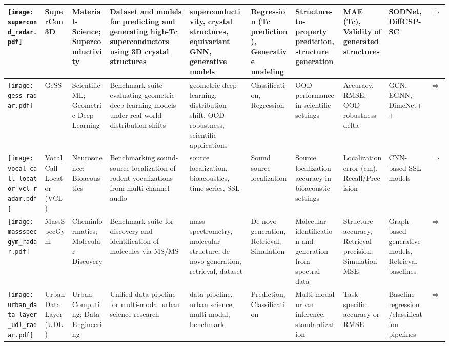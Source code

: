 \begin{landscape}
{\begin{longtable}{|p{}|p{}|p{}|p{}|p{}|p{}|p{}|p{}|p{}|p{}|}
\texttt{[image: supercond\_radar.pdf]} & SuperCon3D & Materials Science; Superconductivity & Dataset and models for predicting and generating high-Tc superconductors using 3D crystal structures & superconductivity, crystal structures, equivariant GNN, generative models & Regression (Tc prediction), Generative modeling & Structure-to-property prediction, structure generation & MAE (Tc), Validity of generated structures & SODNet, DiffCSP-SC & \cite{neurips2024_c4e3b55e}\href{https://neurips.cc/virtual/2024/poster/97553}{$\Rightarrow$} \\ \hline
\texttt{[image: gess\_radar.pdf]} & GeSS & Scientific ML; Geometric Deep Learning & Benchmark suite evaluating geometric deep learning models under real-world distribution shifts & geometric deep learning, distribution shift, OOD robustness, scientific applications & Classification, Regression & OOD performance in scientific settings & Accuracy, RMSE, OOD robustness delta & GCN, EGNN, DimeNet++ & \cite{neurips2024_a8063075}\href{https://neurips.cc/virtual/2024/poster/97816}{$\Rightarrow$} \\ \hline
\texttt{[image: vocal\_call\_locator\_vcl\_radar.pdf]} & Vocal Call Locator (VCL) & Neuroscience; Bioacoustics & Benchmarking sound-source localization of rodent vocalizations from multi-channel audio & source localization, bioacoustics, time-series, SSL & Sound source localization & Source localization accuracy in bioacoustic settings & Localization error (cm), Recall/Precision & CNN-based SSL models & \cite{neurips2024_c00d37d6}\href{https://neurips.cc/virtual/2024/poster/97470}{$\Rightarrow$} \\ \hline
\texttt{[image: massspecgym\_radar.pdf]} & MassSpecGym & Cheminformatics; Molecular Discovery & Benchmark suite for discovery and identification of molecules via MS/MS & mass spectrometry, molecular structure, de novo generation, retrieval, dataset & De novo generation, Retrieval, Simulation & Molecular identification and generation from spectral data & Structure accuracy, Retrieval precision, Simulation MSE & Graph-based generative models, Retrieval baselines & \cite{neurips2024_c6c31413}\href{https://neurips.cc/virtual/2024/poster/97823}{$\Rightarrow$} \\ \hline
\texttt{[image: urban\_data\_layer\_udl\_radar.pdf]} & Urban Data Layer (UDL) & Urban Computing; Data Engineering & Unified data pipeline for multi-modal urban science research & data pipeline, urban science, multi-modal, benchmark & Prediction, Classification & Multi-modal urban inference, standardization & Task-specific accuracy or RMSE & Baseline regression/classification pipelines & \cite{neurips2024_0db7f135}\href{https://neurips.cc/virtual/2024/poster/97837}{$\Rightarrow$} \\ \hline

\end{longtable}}
\end{landscape}
